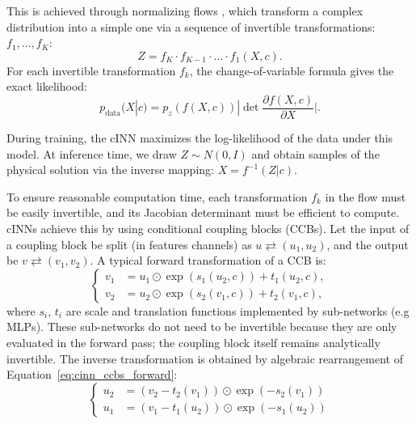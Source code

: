 \documentclass{aa}
\begin{document}
      This is achieved through normalizing flows \citep{rezendeVariationalInferenceNormalizing2016}, which transform a complex distribution into a simple one via a sequence of invertible transformations: $f_1,...,f_K$:
      \begin{equation}
         Z=f_K\cdot f_{K-1}\cdot...\cdot f_1(X,c).
      \end{equation}
      For each invertible transformation $f_k$, the change-of-variable formula gives the exact likelihood:
      \begin{equation}
         p_\text{data}(X|c)=p_z(f(X,c))|\det\frac{\partial f(X,c)}{\partial X}|.
      \end{equation}

      During training, the cINN maximizes the log-likelihood of the data under this model.
      At inference time, we draw $Z\sim N(0,I)$ and obtain samples of the physical solution via the inverse mapping: $X=f^{-1}(Z|c)$.
      
      To ensure reasonable computation time, each transformation $f_k$ in the flow must be easily invertible, and its Jacobian determinant must be efficient to compute.
      cINNs achieve this by using conditional coupling blocks (CCBs).
      Let the input of a coupling block be split (in features channels) as $u\rightleftarrows (u_1,u_2)$, and the output be $v\rightleftarrows (v_1,v_2)$.
      A typical forward transformation of a CCB is:
      \begin{equation}
         \label{eq:cinn_ccbs_forward}
         \left\{
         \begin{aligned}
            v_1 &= u_1\odot\exp (s_1(u_2,c))+t_1(u_2,c), \\
            v_2 &= u_2\odot\exp (s_2(v_1,c))+t_2(v_1,c),
         \end{aligned}
         \right.
      \end{equation}
      where $s_i$, $t_i$ are scale and translation functions implemented by sub-networks (e.g MLPs). 
      These sub-networks do not need to be invertible because they are only evaluated in the forward pass; the coupling block itself remains analytically invertible.
      The inverse transformation is obtained by algebraic rearrangement of Equation~\ref{eq:cinn_ccbs_forward}:
      \begin{equation}
         \label{eq:cinn_ccbs_reverse}
         \left\{
         \begin{aligned}
            u_2 &= (v_2-t_2(v_1))\odot\exp (-s_2(v_1)) \\
            u_1 &= (v_1-t_1(u_2))\odot\exp (-s_1(u_2))
         \end{aligned}
         \right.
      \end{equation}
\end{document}
